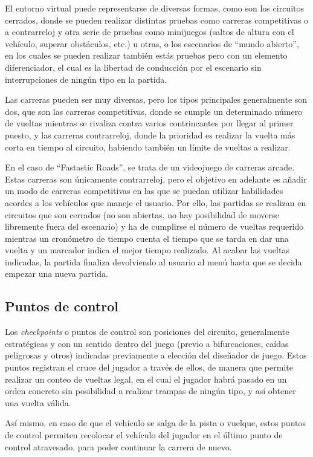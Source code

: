 El entorno virtual puede representarse de diversas formas, como son los circuitos cerrados, donde se pueden realizar distintas pruebas como carreras competitivas o a contrarreloj y otra serie de pruebas como minijuegos (saltos de altura con el vehículo, superar obstáculos, etc.) u otras, o los escenarios de ``mundo abierto'', en los cuales se pueden realizar también estás pruebas pero con un elemento diferenciador, el cual es la libertad de conducción por el escenario sin interrupciones de ningún tipo en la partida.

Las carreras pueden ser muy diversas, pero los tipos principales generalmente son dos, que son las carreras competitivas, donde se cumple un determinado número de vueltas mientras se rivaliza contra varios contrincantes por llegar al primer puesto, y las carreras contrarreloj, donde la prioridad es realizar la vuelta más corta en tiempo al circuito, habiendo también un límite de vueltas a realizar.

En el caso de ``Fastastic Roads'', se trata de un videojuego de carreras arcade. Estas carreras son únicamente contrarreloj, pero el objetivo en adelante es añadir un modo de carreras competitivas en las que se puedan utilizar habilidades acordes a los vehículos que maneje el usuario. Por ello, las partidas se realizan en circuitos que son cerrados (no son abiertas, no hay posibilidad de moverse libremente fuera del escenario) y ha de cumplirse el número de vueltas requerido mientras un cronómetro de tiempo cuenta el tiempo que se tarda en dar una vuelta y un marcador indica el mejor tiempo realizado. Al acabar las vueltas indicadas, la partida finaliza devolviendo al usuario al menú hasta que se decida empezar una nueva partida.

\subsection{Puntos de control}

Los \textit{checkpoints} o puntos de control son posiciones del circuito, generalmente estratégicas y con un sentido dentro del juego (previo a bifurcaciones, caídas peligrosas y otros) indicadas previamente a elección del diseñador de juego. Estos puntos registran el cruce del jugador a través de ellos, de manera que permite realizar un conteo de vueltas legal, en el cual el jugador habrá pasado en un orden concreto sin posibilidad a realizar trampas de ningún tipo, y así obtener una vuelta válida.

Así mismo, en caso de que el vehículo se salga de la pista o vuelque, estos puntos de control permiten recolocar el vehículo del jugador en el último punto de control atravesado, para poder continuar la carrera de nuevo.